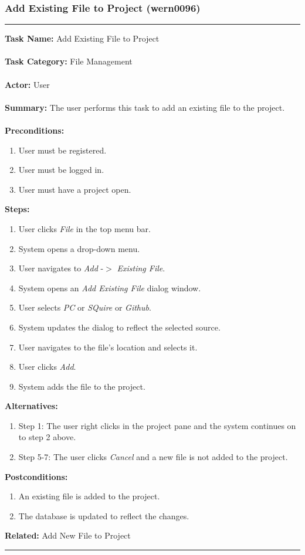 \documentclass[11pt]{report}
\begin{document}
\newpage

\subsubsection{Add Existing File to Project (wern0096)}
\vspace{2pt}
\hrule
\vspace{8pt}
	\noindent\textbf{Task Name:} Add Existing File to Project \\ \\
	\textbf{Task Category:} File Management \\ \\
	\textbf{Actor:} User \\ \\
	\textbf{Summary:} The user performs this task to add an existing file to the project. \\ \\
	\textbf{Preconditions:} 
	\begin{enumerate}
		\item User must be registered.
		\item User must be logged in.
		\item User must have a project open.
	\end{enumerate}
	\textbf{Steps:}
	\begin{enumerate}
		\item User clicks \textit{File} in the top menu bar.
		\item System opens a drop-down menu.
		\item User navigates to \textit{Add} -$>$ \textit{Existing File}.
		\item System opens an \textit{Add Existing File} dialog window.
		\item User selects \textit{PC} or \textit{SQuire} or \textit{Github}.
		\item System updates the dialog to reflect the selected source.
		\item User navigates to the file's location and selects it.
		\item User clicks \textit{Add}.
		\item System adds the file to the project.
	\end{enumerate}
	\textbf{Alternatives:} 
	\begin{enumerate}
		\item Step 1: The user right clicks in the project pane and the system continues on to step 2 above.
		\item Step 5-7: The user clicks \textit{Cancel} and a new file is not added to the project.
	\end{enumerate}
	\textbf{Postconditions:}
	\begin{enumerate}
		\item An existing file is added to the project.
		\item The database is updated to reflect the changes.
	\end{enumerate}
	\textbf{Related:} Add New File to Project
\hrule
\vspace{8pt} 
\end{document}

